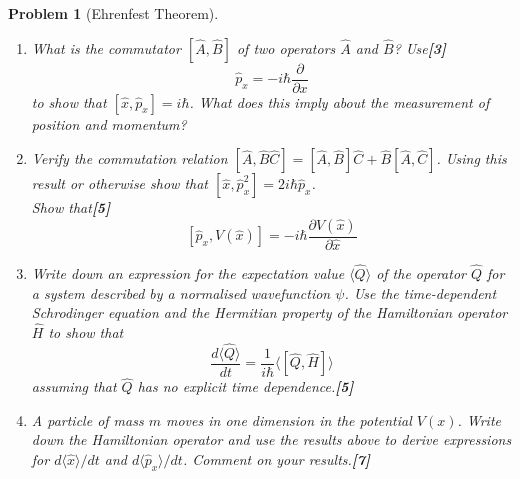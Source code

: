 \documentclass[a4paper]{article}
\theoremstyle{new}
\newtheorem{qns}{Problem}[subsection]
\begin{document}
\newpage
\begin{qns}[Ehrenfest Theorem]\leavevmode
\begin{enumerate}[label=(\alph*)]
\item What is the commutator $[\hat{A},\hat{B}]$ of two operators $\hat{A}$ and $\hat{B}$? Use\hfill\textbf{[3]}
$$\hat{p}_x=-i\hbar\frac{\partial}{\partial x}$$
to show that $[\hat{x},\hat{p}_x]=i\hbar$. What does this imply about the measurement of position and momentum?
\item Verify the commutation relation $[\hat{A},\hat{B}\hat{C}]=[\hat{A},\hat{B}]\hat{C}+\hat{B}[\hat{A},\hat{C}]$. Using this result or otherwise show that $[\hat{x},\hat{p}_x^2]=2i\hbar\hat{p}_x$.\\[5pt]
Show that\hfill\textbf{[5]}
$$[\hat{p}_x,V(\hat{x})]=-i\hbar\frac{\partial V(\hat{x})}{\partial\hat{x}}$$
\item Write down an expression for the expectation value $\langle\hat{Q}\rangle$ of the operator $\hat{Q}$ for a system described by a normalised wavefunction $\psi$. Use the time-dependent Schrodinger equation and the Hermitian property of the Hamiltonian operator $\hat{H}$ to show that
$$\frac{d\langle\hat{Q}\rangle}{dt}=\frac{1}{i\hbar}\langle[\hat{Q},\hat{H}]\rangle$$
assuming that $\hat{Q}$ has no explicit time dependence.\hfill\textbf{[5]}
\item A particle of mass $m$ moves in one dimension in the potential $V(x)$. Write down the Hamiltonian operator and use the results above to derive expressions for $d\langle\hat{x}\rangle/dt$ and $d\langle\hat{p}_x\rangle/dt$. Comment on your results.\hfill\textbf{[7]}
\end{enumerate}
\end{qns}
\end{document}
